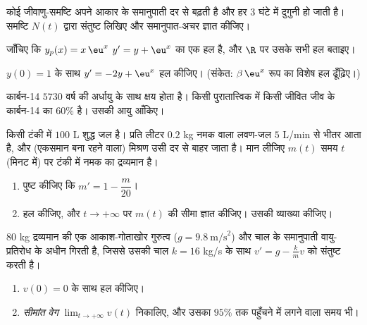 \begin{exercise}[$\star$]\label{exo:g12:diffeq:2}
कोई जीवाणु-समष्टि अपने आकार के समानुपाती दर से बढ़ती है और हर $3$ घंटे में
दुगुनी हो जाती है। समष्टि $N(t)$ द्वारा संतुष्ट  लिखिए और
समानुपात-अचर ज्ञात कीजिए।
\end{exercise}

\begin{exercise}[$\star$]\label{exo:g12:diffeq:3}
जाँचिए कि $y_p(x) = x\,\eu^{x}$ $y' = y + \eu^x$ का एक हल है, और $\R$ पर उसके सभी हल बताइए।
\end{exercise}

\begin{exercise}[$\star\star$]\label{exo:g12:diffeq:4}
$y(0) = 1$ के साथ $y' = -2y + \eu^{x}$ हल कीजिए। (संकेत: $\beta\,\eu^{x}$ रूप का विशेष हल ढूँढ़िए।)
\end{exercise}

\begin{exercise}[$\star\star$]\label{exo:g12:diffeq:5}
कार्बन-14 $5730$ वर्ष की अर्धायु के साथ क्षय होता है। किसी पुरातात्त्विक
 में किसी जीवित जीव के कार्बन-14 का $60\%$ है। उसकी आयु आँकिए।
\end{exercise}

\begin{exercise}[$\star\star$]\label{exo:g12:diffeq:6}
किसी टंकी में $100$ L शुद्ध जल है। प्रति लीटर $0.2$ kg नमक वाला लवण-जल $5$
L/min से भीतर आता है, और (एकसमान बना रहने वाला) मिश्रण उसी दर से बाहर जाता है।
मान लीजिए $m(t)$ समय $t$ (मिनट में) पर टंकी में नमक का द्रव्यमान है।
\begin{enumerate}
  \item पुष्ट कीजिए कि $m' = 1 - \dfrac{m}{20}$।
  \item हल कीजिए, और $t \to +\infty$ पर $m(t)$ की सीमा ज्ञात कीजिए। उसकी व्याख्या
        कीजिए।
\end{enumerate}
\end{exercise}

\begin{exercise}[$\star\star$]\label{exo:g12:diffeq:7}
$80$ kg द्रव्यमान की एक आकाश-गोताखोर गुरुत्व ($g = 9.8\ \text{m/s}^2$) और चाल के समानुपाती
वायु-प्रतिरोध के अधीन गिरती है, जिससे उसकी चाल $k = 16$ kg/s के साथ $v' = g - \frac{k}{m}v$ को
संतुष्ट करती है।
\begin{enumerate}
  \item $v(0) = 0$ के साथ  हल कीजिए।
  \item \emph{सीमांत वेग} $\lim_{t\to+\infty} v(t)$ निकालिए, और उसका $95\%$ तक पहुँचने में लगने
        वाला समय भी।
\end{enumerate}
\end{exercise}

